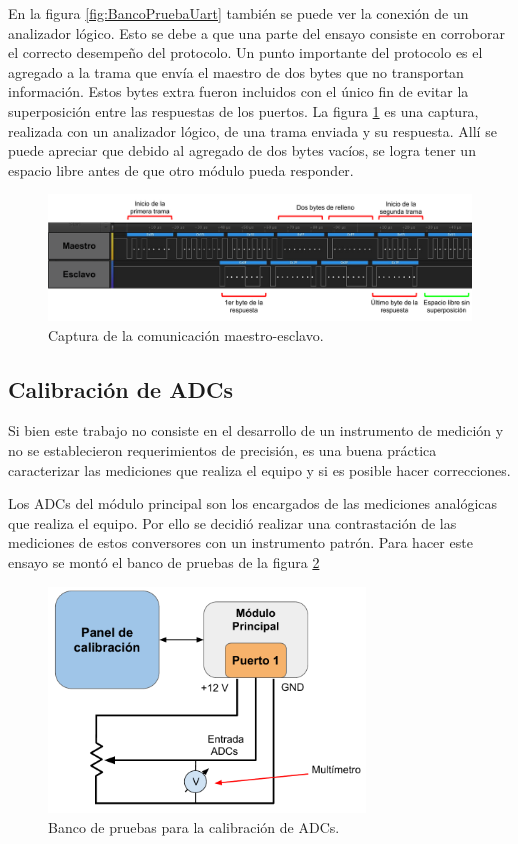 En la figura \ref{fig:BancoPruebaUart} también se puede ver la conexión de un analizador lógico. Esto se debe a que una parte del ensayo consiste en corroborar el correcto desempeño del protocolo. 
Un punto importante del protocolo es el agregado a la trama que envía el maestro de dos bytes que no transportan información. Estos bytes extra fueron incluidos con el único fin de evitar la superposición entre las respuestas de los puertos. 
La figura \ref{fig:CapturaAnalizador} es una captura, realizada con un analizador lógico, de una trama enviada y su respuesta. Allí se puede apreciar que debido al agregado de dos bytes vacíos, se logra tener un espacio libre antes de que otro módulo pueda responder.

\begin{figure}[H]
	\centering
	\includegraphics[width=1\textwidth]{./Figures/CapturaAnalizador.pdf}
	\caption{Captura de la comunicación maestro-esclavo.}
	\label{fig:CapturaAnalizador}
\end{figure}

\subsection{Calibración de ADCs}

Si bien este trabajo no consiste en el desarrollo de un instrumento de medición y no se establecieron requerimientos de precisión, es una buena práctica caracterizar las mediciones que realiza el equipo y si es posible hacer correcciones. 

Los ADCs del módulo principal son los encargados de las mediciones analógicas que realiza el equipo. Por ello se decidió realizar una contrastación de las mediciones de estos conversores con un instrumento patrón. Para hacer este ensayo se montó el banco de pruebas de la figura \ref{fig:BancoCal}

\begin{figure}[H]
	\centering
	\includegraphics[width=0.75\textwidth]{./Figures/BancoCal.pdf}
	\caption{Banco de pruebas para la calibración de ADCs.}
	\label{fig:BancoCal}
\end{figure}

